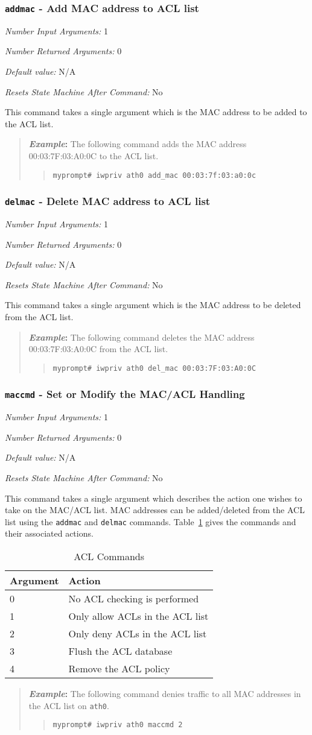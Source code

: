 \documentclass[10pt,fullpage]{article}
\newcommand{\mytt}[1]{{\texttt{#1}}}
\newcommand{\bv}{\begin{verse}}
\newcommand{\ev}{\end{verse}}
\newcommand{\cmd}[1]{{\texttt{myprompt\# #1}}}
\newcommand{\argdesc}[4]{\begin{description}
\itemsep -6pt
\item \textit{Number Input Arguments:} #1
\item \textit{Number Returned Arguments:} #2
\item \textit{Default value:} #3
\item \textit{Resets State Machine After Command:} #4
\end{description}
}
\newenvironment{example}{\begin{quote}\textbf{\textit{Example}:}}{\end{quote}}
\begin{document}
\subsubsection{\mytt{addmac} - Add MAC address to ACL list}
\argdesc{1}{0}{N/A}{No}
This command takes a single argument which is the MAC address to be
added to the ACL list.
\begin{example}
  The following command adds the MAC address 00:03:7F:03:A0:0C to the
  ACL list.
  \bv
  \cmd{iwpriv ath0 add\_mac 00:03:7f:03:a0:0c}
  \ev
\end{example}

\subsubsection{\mytt{delmac} - Delete MAC address to ACL list}
\argdesc{1}{0}{N/A}{No}
This command takes a single argument which is the MAC address to be
deleted from the ACL list.
\begin{example}
  The following command deletes the MAC address 00:03:7F:03:A0:0C from
  the ACL list.
  \bv
  \cmd{iwpriv ath0 del\_mac 00:03:7F:03:A0:0C}
  \ev
\end{example}

\subsubsection{\mytt{maccmd} - Set or Modify the MAC/ACL Handling}
\argdesc{1}{0}{N/A}{No}
This command takes a single argument which describes the action one
wishes to take on the MAC/ACL list.  MAC addresses can be
added/deleted from the ACL list using the \mytt{addmac} and
\mytt{delmac} commands.  Table~\ref{tab:maccmd} gives the commands and
their associated actions.
\begin{table}[h*]
  \centering
  \begin{tabular}{|l|l|} \hline
    Argument & Action \\ \hline
    0 & No ACL checking is performed \\
    1 & Only allow ACLs in the ACL list \\
    2 & Only deny ACLs in the ACL list \\
    3 & Flush the ACL database \\
    4 & Remove the ACL policy \\ \hline
  \end{tabular}
  \caption{ACL Commands}
  \label{tab:maccmd}
\end{table}
\begin{example}
  The following command denies traffic to all MAC addresses in the ACL
  list on \mytt{ath0}.
  \bv
  \cmd{iwpriv ath0 maccmd 2}
  \ev
\end{example}
\end{document}
